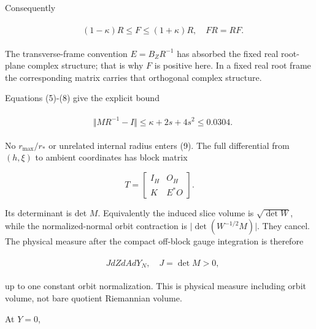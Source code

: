 Consequently

\begin{gather*}
\begin{aligned}
& (1-\kappa )R \le  F \le  (1+\kappa )R, \quad  FR=RF.
\end{aligned}\tag{8}
\end{gather*}

The transverse-frame convention \(E=B_{Z} R^{-1}\) has absorbed the
fixed real root-plane complex structure; that is why \(F\) is positive
here. In a fixed real root frame the corresponding matrix carries that
orthogonal complex structure.

Equations (5)-(8) give the explicit bound

\begin{gather*}
\begin{aligned}
& \Vert M R^{-1}-I\Vert  \le  \kappa +2s+4s^{2} \le 0.0304.
\end{aligned}\tag{9}
\end{gather*}

No \(r_{\max}/r_{*}\) or unrelated internal radius enters (9). The full
differential from \((h,\xi )\) to ambient coordinates has block matrix

\[T=\begin{bmatrix}I_H&O_H\\K&E^{*}O\end{bmatrix}.\]

Its determinant is det \(M\). Equivalently the induced slice volume is
\(\sqrt{\det  W}\), while the normalized-normal orbit contraction is
\(\vert \det (W^{-1/2}M)\vert\). They cancel. The physical measure after
the compact off-block gauge integration is therefore

\begin{gather*}
\begin{aligned}
& J dZ dA dY_{N}, \quad  J=\det  M>0,
\end{aligned}\tag{10}
\end{gather*}

up to one constant orbit normalization. This is physical measure
including orbit volume, not bare quotient Riemannian volume.

At \(Y=0\),

